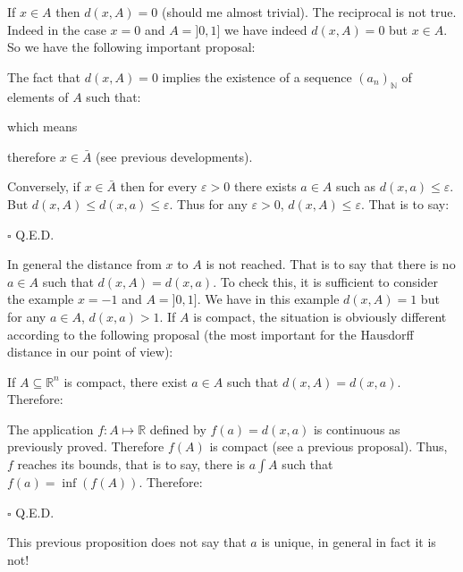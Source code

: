 	\begin{theorem}
	If $x\in A$ then $d(x,A)=0$ (should me almost trivial). The reciprocal is not true. Indeed in the case $x=0$ and $A=]0,1]$ we have indeed $d(x,A)=0$ but $x \in A$. So we have the following important proposal:
	
	\end{theorem}
	\begin{dem}
	The fact that $d(x,A)=0$ implies the existence of a sequence $(a_n)_{\mathbb{N}}$ of elements of $A$ such that:
	
	which means
	
	therefore $x\in \bar{A}$ (see previous developments).

	Conversely, if $x\in \bar{A}$ then for every $\varepsilon>0$ there exists $a\in A$ such as $d(x,a)\leq \varepsilon$. But $d(x,A)\leq d(x,a)\leq \varepsilon$. Thus for any $\varepsilon>0$, $d(x,A)\leq \varepsilon$. That is to say:
	
	\begin{flushright}
		$\square$  Q.E.D.
	\end{flushright}
	\end{dem}
	In general the distance from $x$ to $A$ is not reached. That is to say that there is no $a\in A$ such that $d(x,A)=d(x,a)$. To check this, it is sufficient to consider the example $x=-1$ and $A=]0,1]$. We have in this example $d(x,A)=1$ but for any $a\in A$, $d(x,a)>1$. If $A$ is compact, the situation is obviously different according to the following proposal (the most important for the Hausdorff distance in our point of view):	
	\begin{theorem}
		If $A\subseteq \mathbb{R}^n$ is compact, there exist $a\in A$ such that $d(x,A)=d(x,a)$. Therefore:
		
	\end{theorem}
	\begin{dem}
	The application $f:A\mapsto \mathbb{R}$ defined by $f(a)=d(x,a)$ is continuous as previously proved. Therefore $f(A)$ is compact (see a previous proposal). Thus, $f$ reaches its bounds, that is to say, there is $a\int A$ such that $f (a) =\inf(f (A))$. Therefore:
	
	\begin{flushright}
		$\square$  Q.E.D.
	\end{flushright}
	\end{dem}
	\begin{tcolorbox}[title=Remark,colframe=black,arc=10pt]
	This previous proposition does not say that $a$ is unique, in general in fact it is not!
	\end{tcolorbox}
	

